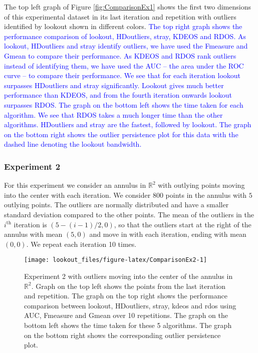 \documentclass[
]{article}
\begin{document}
The top left graph of Figure \ref{fig:ComparisonEx1} shows the first two
dimensions of this experimental dataset in its last iteration and
repetition with outliers identified by lookout shown in different
colors.
\textcolor{blue}{ The top right graph shows the performance comparison of lookout, HDoutliers, stray, KDEOS and RDOS. As lookout, HDoutliers and stray identify outliers, we have used the Fmeasure and Gmean to compare their performance. As KDEOS and RDOS rank outliers instead of identifying them, we have used the AUC -- the area under the ROC curve -- to compare their performance. We see that for each iteration lookout surpasses HDoutliers and stray significantly. Lookout gives much better performance than KDEOS, and from the fourth iteration onwards lookout surpasses RDOS. The graph on the bottom left shows the time taken for each algorithm. We see that RDOS takes a much longer time than the other algorithms. HDoutliers and stray are the fastest, followed by lookout. The graph on the bottom right shows the outlier persistence plot for this data with the dashed line denoting the lookout bandwidth.}

\hypertarget{experiment-2}{%
\subsubsection*{Experiment 2}\label{experiment-2}}

For this experiment we consider an annulus in \(\mathbb{R}^2\) with
outlying points moving into the center with each iteration. We consider
\(800\) points in the annulus with \(5\) outlying points. The outliers
are normally distributed and have a smaller standard deviation compared
to the other points. The mean of the outliers in the \(i^{\text{th}}\)
iteration is \(\left( 5 - (i-1) /2, 0 \right)\), so that the outliers
start at the right of the annulus with mean \((5,0)\) and move in with
each iteration, ending with mean \((0,0)\). We repeat each iteration 10
times.

\begin{figure}
\texttt{[image: lookout\_files/figure-latex/ComparisonEx2-1]} \caption{Experiment 2 with outliers moving into the center of the annulus in $\mathbb{R}^2$. Graph on the top left shows the points from the last iteration and repetition. The graph on the top right shows the performance comparison between lookout, HDoutliers, stray, kdeos and rdos using AUC, Fmeasure and Gmean over 10 repetitions. The graph on the bottom left shows the time taken for these 5 algorithms. The graph on the bottom right shows the corresponding outlier persistence plot.}\label{fig:ComparisonEx2}
\end{figure}
\end{document}
